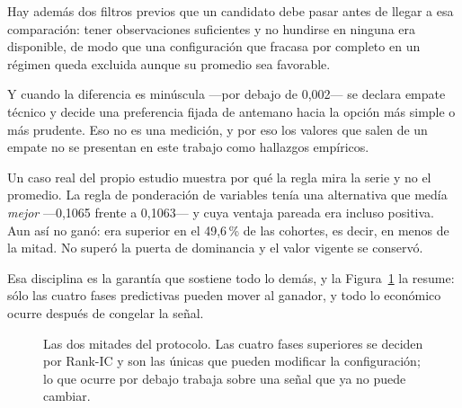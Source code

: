 Hay además dos filtros previos que un candidato debe pasar antes de llegar a esa comparación: tener
observaciones suficientes y no hundirse en ninguna era disponible, de modo que una configuración que
fracasa por completo en un régimen queda excluida aunque su promedio sea favorable.

Y cuando la diferencia es minúscula ---por debajo de 0,002--- se declara empate técnico y decide una
preferencia fijada de antemano hacia la opción más simple o más prudente. Eso no es una medición, y
por eso los valores que salen de un empate no se presentan en este trabajo como hallazgos empíricos.

Un caso real del propio estudio muestra por qué la regla mira la serie y no el promedio. La regla de
ponderación de variables tenía una alternativa que medía \emph{mejor} ---0,1065 frente a 0,1063--- y
cuya ventaja pareada era incluso positiva. Aun así no ganó: era superior en el 49,6\,\% de las
cohortes, es decir, en menos de la mitad. No superó la puerta de dominancia y el valor vigente se
conservó.

Esa disciplina es la garantía que sostiene todo lo demás, y la Figura~\ref{fig:protocolo} la resume:
sólo las cuatro fases predictivas pueden mover al ganador, y todo lo económico ocurre después de
congelar la señal.

\begin{figure}[htbp]
  \centering
  \caption{Las dos mitades del protocolo. Las cuatro fases superiores se deciden por Rank-IC y son
  las únicas que pueden modificar la configuración; lo que ocurre por debajo trabaja sobre una señal
  que ya no puede cambiar.}
  \label{fig:protocolo}
\end{figure}

